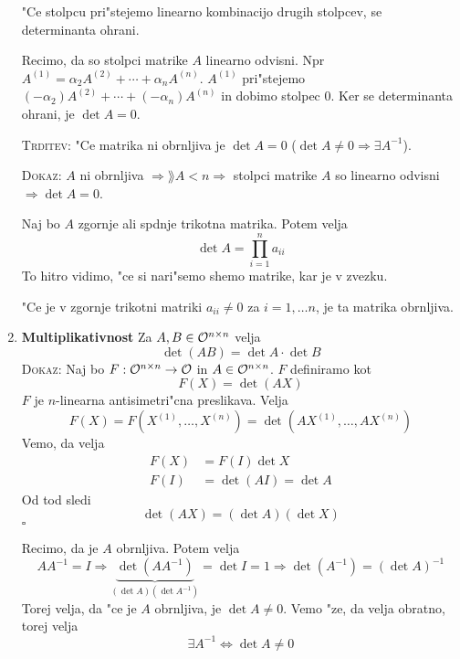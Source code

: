 \begin{enumerate}
	"Ce stolpcu pri"stejemo linearno kombinacijo drugih stolpcev, se determinanta ohrani.
	
	Recimo, da so stolpci matrike $A$ linearno odvisni. Npr $A^{(1)} = \alpha_2 A^{(2)} + \cdots + \alpha_n A^{(n)}$. $A^{(1)}$ pri"stejemo $(-\alpha_2)A^{(2)} + \cdots + (-\alpha_n)A^{(n)}$ in dobimo stolpec 0. Ker se determinanta ohrani, je $\det A = 0$.
	
	\textsc{Trditev:} "Ce matrika ni obrnljiva je $\det A = 0$ ($\det A \neq 0 \Rightarrow \exists A^{-1}$).
	
	\textsc{Dokaz:} $A$ ni obrnljiva $\Rightarrow \rang A < n \Rightarrow$ stolpci matrike $A$ so linearno odvisni $\Rightarrow \det A = 0$.
	
	Naj bo $A$ zgornje ali spdnje trikotna matrika. Potem velja
	\begin{equation*}
	\det A = \prod_{i=1}^{n} a_{ii}
	\end{equation*}
	To hitro vidimo, "ce si nari"semo shemo matrike, kar je v zvezku.
	
	"Ce je v zgornje trikotni matriki $a_{ii} \neq 0$ za $i = 1, \ldots n$, je ta matrika obrnljiva.
	
	\item \textbf{Multiplikativnost}
	Za $A, B \in \mathcal{O}^{n \times n}$ velja
	\begin{equation*}
	\det (A B) = \det A \cdot \det B
	\end{equation*}
	\textsc{Dokaz:} Naj bo $F: \mathcal{O}^{n \times n} \to \mathcal{O}$ in $A \in \mathcal{O}^{n \times n}$. $F$ definiramo kot
	\begin{equation*}
	F(X) = \det(AX)
	\end{equation*}
	$F$ je $n$-linearna antisimetri"cna preslikava. Velja
	\begin{equation*}
	F(X) = F(X^{(1)}, \ldots, X^{(n)}) = \det(A X^{(1)}, \ldots, AX^{(n)})
	\end{equation*}
	Vemo, da velja
	\begin{align*}
	F(X) &= F(I) \det X \\
	F(I) &= \det (AI) = \det A
	\end{align*}
	Od tod sledi
	\begin{equation*}
	\det (AX) = (\det A) (\det X)
	\end{equation*}
	\hfill $\square$
	
	Recimo, da je $A$ obrnljiva. Potem velja
	\begin{equation*}
	A A^{-1} = I \Rightarrow \underbrace{\det (A A^{-1})}_{(\det A) (\det A^{-1})} = \det I = 1 \Rightarrow \det(A^{-1}) = (\det A)^{-1}
	\end{equation*}
	Torej velja, da "ce je $A$ obrnljiva, je $\det A \neq 0$. Vemo "ze, da velja obratno, torej velja
	\begin{equation*}
	\exists A^{-1} \iff \det A \neq 0
	\end{equation*}
	

\end{enumerate}
